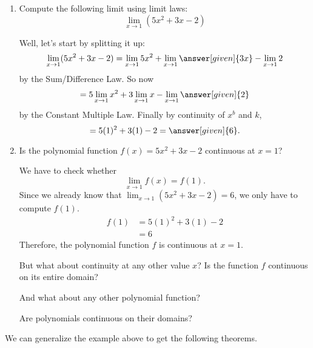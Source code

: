\documentclass{ximera}
\begin{document}
\begin{example}
\begin{enumerate}
\item  Compute the following limit using limit laws:
\[
  \lim_{x\to 1}(5x^2+3x-2)
\]
\begin{explanation}
  Well, let's start by splitting it up:
  \[
  \lim_{x\to 1} (5x^2+3x-2) = \lim_{x\to 1} 5x^2 + \lim_{x\to 1} \answer[given]{3x} - \lim_{x\to 1}2
  \]
  by the Sum/Difference Law. So now
  \[
  = 5\lim_{x\to 1} x^2 + 3\lim_{x\to 1} x - \lim_{x\to 1}\answer[given]{2}
  \]
  by the Constant Multiple Law. Finally by continuity of $x^b$ and $k$,
  \[
  = 5(1)^2 + 3(1) - 2 =\answer[given]{6}.
  \]
  
\end{explanation}  
\item Is the polynomial function  $f(x)=5x^2+3x-2$ continuous at $x=1$?
\begin{explanation}
We have to check whether
\[
 \lim_{x\to 1} f(x)=f(1). 
\]
Since we already know that $ \lim_{x\to 1} (5x^2+3x-2)=6$,  we only have  to compute $f(1)$.
\begin{align*}
f(1)&=5(1)^2 + 3(1) - 2\\
&=6
\end{align*}
Therefore, the polynomial function $f$ is continuous at $x=1$.

But what about continuity at any other value $x$? Is the function $f$ continuous on its entire domain?

And what about any other polynomial function?

Are polynomials continuous on their domains?
\end{explanation}
\end{enumerate}
\end{example}

We can generalize the example above to get the following theorems.
\end{document}
